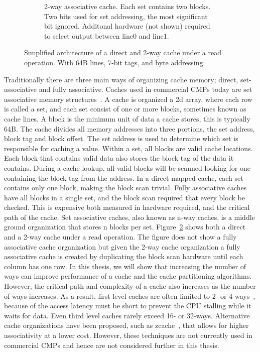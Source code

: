 \begin{figure}
\begin{subfigure}[b]{0.45\textwidth}
        \caption{2-way associative cache. Each set contains two blocks. Two bits used for set addressing, the most significant bit ignored. Additonal hardware (not shown) required to select output between line0 and line1.}
        \label{fig:introduction:cache:2way}
    \end{subfigure}
    \caption{Simplified architecture of a direct and 2-way cache under a read operation. With 64B lines, 7-bit tags, and byte addressing.}
    \label{fig:introduction:cache}
\end{figure}

Traditionally there are three main ways of organizing cache memory; direct, set-associative and fully associative.
Caches used in commercial CMPs today are set associative memory structures~\cite{Thomadakis2011, Jain2013, ARM2010, Ho2014}.
A cache is organized a 2d array, where each row is called a set, and each set consist of one or more blocks, sometimes known as cache lines.
A block is the minimum unit of data a cache stores, this is typically 64B.
The cache divides all memory addresses into three portions, the set address, block tag and block offset.
The set address is used to determine which set is responsible for caching a value.
Within a set, all blocks are valid cache locations.
Each block that contains valid data also stores the block tag of the data it contains.
During a cache lookup, all valid blocks will be scanned looking for one containing the block tag from the address.
In a direct mapped cache, each set contains only one block, making the block scan trivial.
Fully associative caches have all blocks in a single set, and the block scan required that every block be checked.
This is expensive both measured in hardware required, and the critical path of the cache.
Set associative caches, also known as n-way caches, is a middle ground organization that stores n blocks per set.
Figure~\ref{fig:introduction:cache} shows both a direct and a 2-way cache under a read operation.
The figure does not show a fully associative cache organization but given the 2-way cache organization a fully associative cache is created by duplicating the block scan hardware until each column has one row.
In this thesis, we will show that increasing the number of ways can improve performance of a cache and the cache partitioning algorithms.
However, the critical path and complexity of a cache also increases as the number of ways increases.
As a result, first level caches are often limited to 2- or 4-ways~\cite{Sanchez2010}, because of the access latency must be short to prevent the CPU stalling while it waits for data. 
Even third level caches rarely exceed 16- or 32-ways.
Alternative cache organizations have been proposed, such as zcache~\cite{Sanchez2010}, that allows for higher associativity at a lower cost.
However, these techniques are not currently used in commercial CMPs and hence are not considered further in this thesis.


